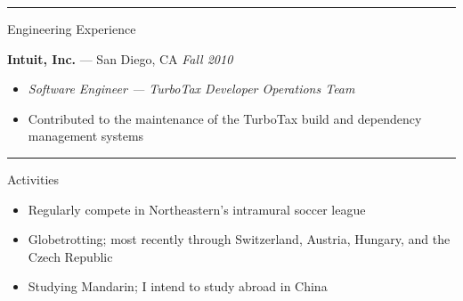 \documentclass[10pt]{letter}
\begin{document}
\rule{\linewidth}{.5pt}

{\Large Engineering Experience}

\begin{tabbing}
{\large \bf Intuit, Inc.} --- San Diego, CA \` \textit{Fall 2010}

\end{tabbing}

\begin{itemize}
\setlength\itemsep{1pt}
\item [] {\textit{Software Engineer --- TurboTax Developer Operations Team}}
\item{Contributed to the maintenance of the TurboTax build and dependency
  management systems}
\end{itemize}

\rule{\linewidth}{.5pt}

{\Large Activities}
\begin{itemize}
\setlength\itemsep{1pt}
\item{Regularly compete in Northeastern's intramural soccer league}
\item{Globetrotting; most recently through Switzerland, Austria, Hungary, and
  the Czech Republic}
\item{Studying Mandarin; I intend to study abroad in China}
\end{itemize} 
\end{document}
